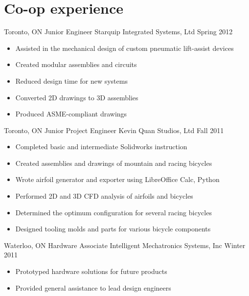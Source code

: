 \documentclass[10pt, letterpaper]{moderncv}
\begin{document}
\section{Co-op experience}
    \begin{samepage}
      \cventry
          {Toronto, ON}
          {Junior Engineer%
}
          {%
Starquip Integrated Systems, Ltd%
}
          {Spring 2012}
        {}
        {
            \begin{itemize}
                \item{Assisted in the mechanical design of custom pneumatic lift-assist devices}
                \item{Created modular assemblies and circuits}
                \item{Reduced design time for new systems}
                \item{Converted 2D drawings to 3D assemblies}
                \item{Produced ASME-compliant drawings}
            \end{itemize}
        }
    \end{samepage}
    \begin{samepage}
      \cventry
          {Toronto, ON}
          {Junior Project Engineer%
}
          {%
Kevin Quan Studios, Ltd%
}
          {Fall 2011}
        {}
        {
            \begin{itemize}
                \item{Completed basic and intermediate Solidworks instruction}
                \item{Created assemblies and drawings of mountain and racing bicycles}
                \item{Wrote airfoil generator and exporter using LibreOffice Calc, Python}
                \item{Performed 2D and 3D CFD analysis of airfoils and bicycles}
                \item{Determined the optimum configuration for several racing bicycles}
                \item{Designed tooling molds and parts for various bicycle components}
            \end{itemize}
        }
    \end{samepage}
    \begin{samepage}
      \cventry
          {Waterloo, ON}
          {Hardware Associate%
}
          {%
Intelligent Mechatronics Systems, Inc%
}
          {Winter 2011}
        {}
        {
            \begin{itemize}
                \item{Prototyped hardware solutions for future products}
                \item{Provided general assistance to lead design engineers}
            \end{itemize}
        }
    \end{samepage}
\end{document}
